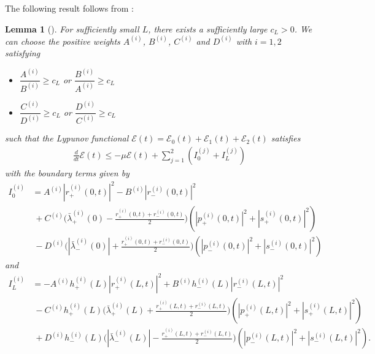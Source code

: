 \documentclass[12pt]{article}
\newtheorem{lemma}[theorem]{Lemma}
\numberwithin{equation}{section}
\begin{document}
The following result follows from \cite{MR2996527}:
\begin{lemma}[\cite{MR2996527}]
For sufficiently small $L$, there exists a sufficiently large $c_L>0$. We can choose the positive weights
$A^{(i)}$, $B^{(i)}$, $C^{(i)}$ and $D^{(i)}$ with $i=1,2$ satisfying
\begin{itemize}
    \item[(i)] $\dfrac{A^{(i)}}{B^{(i)}}\geq c_L$ or $\dfrac{B^{(i)}}{A^{(i)}}\geq c_L$
    \item[(ii)] $\dfrac{C^{(i)}}{D^{(i)}}\geq c_L$ or $\dfrac{D^{(i)}}{C^{(i)}}\geq c_L$
\end{itemize}
such that the Lypunov functional $\mathcal{E}(t)=\mathcal{E}_0(t)+\mathcal{E}_1(t)+\mathcal{E}_2(t)$ satisfies 
\begin{align}\label{Ly-estimate}
    \frac{d}{dt}\mathcal{E}(t) \leq -\mu \mathcal{E}(t)+\sum_{j=1}^2\left(I^{(j)}_0+I^{(j)}_L\right)
\end{align}
with the boundary terms given by
\begin{align}
I^{(i)}_0 &= A^{(i)} |r_+^{(i)}(0,t)|^2-B^{(i)} |r_-^{(i)}(0,t)|^2\nonumber\\[1mm]
&~ +C^{(i)}\Big(\bar{\lambda}^{(i)}_+(0)-\frac{r^{(i)}_+(0,t)+r^{(i)}_-(0,t)}{2}\Big)\left(|p_+^{(i)}(0,t)|^2+|s_+^{(i)}(0,t)|^2\right)\nonumber\\
&~ -D^{(i)}\Big(|\bar{\lambda}^{(i)}_-(0)|+\frac{r^{(i)}_+(0,t)+r^{(i)}_-(0,t)}{2}\Big)\left(|p_-^{(i)}(0,t)|^2+|s_-^{(i)}(0,t)|^2\right)\nonumber
\end{align}
and
\begin{align}
I^{(i)}_L &= -A^{(i)}h_+^{(i)}(L)|r_+^{(i)}(L,t)|^2+B^{(i)}h_-^{(i)}(L)|r_-^{(i)}(L,t)|^2\nonumber\\[1mm]
&~-C^{(i)}h_+^{(i)}(L)\Big(\bar{\lambda}^{(i)}_+(L)+\frac{r^{(i)}_+(L,t)+r^{(i)}_-(L,t)}{2}\Big)\left(|p_+^{(i)}(L,t)|^2+|s_+^{(i)}(L,t)|^2\right)\nonumber\\
&~+ D^{(i)}h_-^{(i)}(L)\Big(|\bar{\lambda}^{(i)}_-(L)|-\frac{r^{(i)}_+(L,t)+r^{(i)}_-(L,t)}{2}\Big)\left(|p_-^{(i)}(L,t)|^2+|s_-^{(i)}(L,t)|^2\right).\nonumber
\end{align}
\end{lemma}
\end{document}
